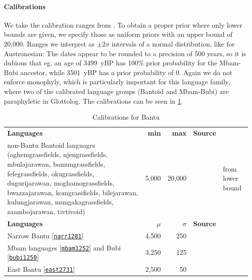 \documentclass[]{rsos}%
\newcommand{\glot}[2]{#1 {\scriptsize{[\texttt{\href{https://glottolog.org/resource/languoid/id/#2}{#2}}]}}}
\begin{document}
\paragraph{Calibrations}
We take the calibration ranges from \textcite{grollemund2015bantu}.
To obtain a proper prior where only lower bounds are given, we specify those as uniform priors with an upper bound of 20,000. Ranges we interpret as $\pm 2\sigma$ intervals of a normal distribution, like for Austronesian:
The dates appear to be rounded to a precision of 500 years, so it is dubious that eg. an age of 3499~yBP has 100\% prior probability for the Mbam-Bubi ancestor, while 3501~yBP has a prior probability of 0.
Again we do not enforce monophyly, which is particularly important for this language family, where two of the calibrated language groups (Bantoid and Mbam-Bubi) are paraphyletic in Glottolog. The calibrations can be seen in \cref{t:bantu}.
\begin{table}
    \centering
    \begin{tabular}{p{7cm}rrcl}
\textbf{Languages} & \textbf{min} & \textbf{max} & \textbf{Source}\\
non-Bantu Bantoid languages (aghemgrassfields, njengrassfields, mbulajarawan, bamungrassfields, fefegrassfields, okugrassfields, dugurijarawan, moghamograssfields, bwazzajarawan, komgrassfields, bilejarawan, kulungjarawan, mungakagrassfields, zaambojarawan, tivtivoid)& 5,000 & 20,000 & \parencite{grollemund2015bantu} & from lower bound\\
\textbf{Languages} & \textbf{$\mu$} & \textbf{$\sigma$} & \textbf{Source}\\
\glot{Narrow Bantu}{narr1281} & 4,500 & 250 & \parencite{grollemund2015bantu} \\
\glot{Mbam languages}{mbam1252} and \glot{Bubi}{bubi1250} & 3,250 & 125 & \parencite{grollemund2015bantu} \\
\glot{East Bantu}{east2731} & 2,500 & 50 & \parencite{grollemund2015bantu}
    \end{tabular}
    \caption{Calibrations for Bantu}
    \label{t:bantu}
\end{table}
\end{document}
